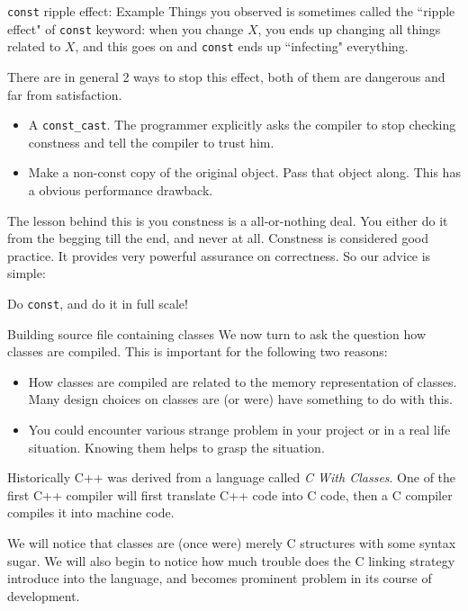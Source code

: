 \begin{frame}[fragile]{\texttt{const} ripple effect: Example}
Things you observed is sometimes called the ``ripple effect" of \texttt{const} keyword: when you change $X$, you ends up changing all things related to $X$, and this goes on and \texttt{const} ends up ``infecting" everything.

There are in general 2 ways to stop this effect, both of them are dangerous and far from satisfaction.
\begin{itemize}
	\item A \texttt{const\_cast}. The programmer explicitly asks the compiler to stop checking constness and tell the compiler to trust him. 
	\item Make a non-const copy of the original object. Pass that object along. This has a obvious performance drawback.
\end{itemize}

The lesson behind this is you \alert{constness is a all-or-nothing deal}. You either do it from the begging till the end, and never at all. Constness is considered good practice. It provides very powerful assurance on correctness. So our advice is simple:
\begin{center}
	\alert{Do \texttt{const}, and do it in full scale!}
\end{center}
\end{frame}

\begin{frame}{Building source file containing classes}
We now turn to ask the question how classes are compiled. This is important for the following two reasons:
\begin{itemize}
	\item How classes are compiled are related to the memory representation of classes. Many design choices on classes are (or were) have something to do with this.
	\item You could encounter various strange problem in your project or in a real life situation. Knowing them helps to grasp the situation. 
\end{itemize}
Historically C++ was derived from a language called \textit{C With Classes}. One of the first C++ compiler will first translate C++ code into C code, then a C compiler compiles it into machine code. 

\vspace{0.03in}
We will notice that classes are (once were) merely C structures with some syntax sugar. We will also begin to notice how much trouble does the C linking strategy introduce into the language, and becomes prominent problem in its course of development. 
\end{frame}

